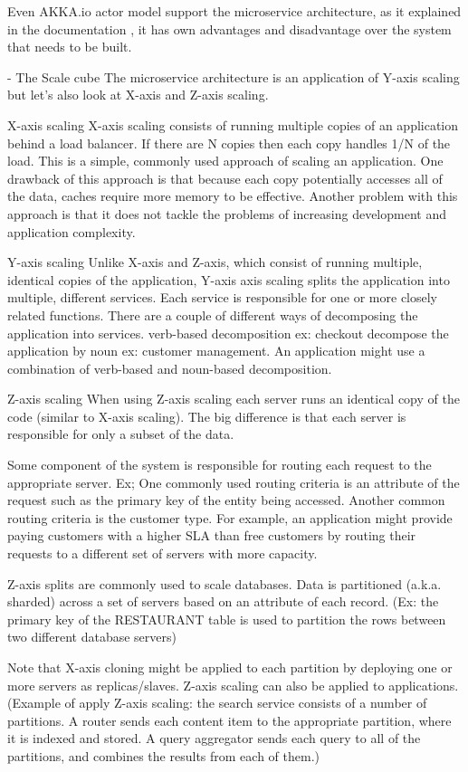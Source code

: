 Even AKKA.io actor model support the microservice architecture, as it explained in the documentation \cite{Akka.ioWhenCluster}, it has own advantages and disadvantage over the system that needs to be built.

- The Scale cube
The microservice architecture is an application of Y-axis scaling but let’s also look at X-axis and Z-axis scaling.

X-axis scaling
X-axis scaling consists of running multiple copies of an application behind a load balancer. If there are N copies then each copy handles 1/N of the load. This is a simple, commonly used approach of scaling an application.
One drawback of this approach is that because each copy potentially accesses all of the data, caches require more memory to be effective. Another problem with this approach is that it does not tackle the problems of increasing development and application complexity.

Y-axis scaling
Unlike X-axis and Z-axis, which consist of running multiple, identical copies of the application, Y-axis axis scaling splits the application into multiple, different services. Each service is responsible for one or more closely related functions. There are a couple of different ways of decomposing the application into services.
verb-based decomposition ex: checkout
decompose the application by noun ex: customer management. 
An application might use a combination of verb-based and noun-based decomposition.

Z-axis scaling
When using Z-axis scaling each server runs an identical copy of the code (similar to X-axis scaling). The big difference is that each server is responsible for only a subset of the data. 

Some component of the system is responsible for routing each request to the appropriate server. Ex;
One commonly used routing criteria is an attribute of the request such as the primary key of the entity being accessed. 
Another common routing criteria is the customer type. For example, an application might provide paying customers with a higher SLA than free customers by routing their requests to a different set of servers with more capacity.

Z-axis splits are commonly used to scale databases. Data is partitioned (a.k.a. sharded) across a set of servers based on an attribute of each record. (Ex: the primary key of the RESTAURANT table is used to partition the rows between two different database servers)

Note that X-axis cloning might be applied to each partition by deploying one or more servers as replicas/slaves. Z-axis scaling can also be applied to applications.
(Example of apply Z-axis scaling: the search service consists of a number of partitions. A router sends each content item to the appropriate partition, where it is indexed and stored. A query aggregator sends each query to all of the partitions, and combines the results from each of them.)

